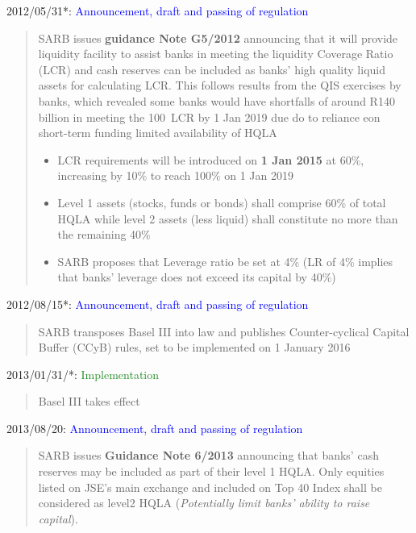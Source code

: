 \documentclass[
  letterpaper,
  DIV=11,
  numbers=noendperiod]{scrartcl}
\begin{document}
2012/05/31*:
\textcolor{blue}{Announcement, draft and passing of regulation}

\begin{quote}
SARB issues \textbf{guidance Note G5/2012} announcing that it will provide  liquidity facility to assist banks in meeting the liquidity Coverage Ratio (LCR) and cash reserves can be included as banks' high quality liquid assets for calculating LCR. This follows results from the QIS exercises by banks,  which revealed some banks would have shortfalls of around R140 billion in meeting the 100\ LCR  by 1 Jan 2019 due do to reliance eon short-term funding limited availability of HQLA

\begin{itemize}
    \item LCR requirements will be introduced on \textbf{1 Jan 2015} at 60\%, increasing by 10\% to reach 100\% on 1 Jan 2019
\item Level 1 assets (stocks, funds or bonds) shall comprise 60\% of total HQLA  while level 2 assets (less liquid) shall constitute no more than the remaining 40\%
\item SARB proposes that Leverage ratio be set at 4\% (LR of 4\% implies that banks' leverage does not exceed its capital by 40\%)
\end{itemize}
\end{quote}

2012/08/15*:
\textcolor{blue}{Announcement, draft and passing of regulation}

\begin{quote}
SARB transposes Basel III into law and publishes Counter-cyclical Capital Buffer (CCyB) rules, set to be implemented on 1 January 2016
\end{quote}

2013/01/31/*: \textcolor{ForestGreen}{Implementation}

\begin{quote}
    Basel III takes effect
\end{quote}

2013/08/20:
\textcolor{blue}{Announcement, draft and passing of regulation}

\begin{quote}
 SARB issues \textbf{Guidance Note 6/2013} announcing that banks' cash reserves may be included as part of their level 1 HQLA. Only equities listed on JSE's main exchange and included on Top 40 Index shall be considered as level2 HQLA (\textit{Potentially limit banks' ability to raise capital}).
\end{quote}
\end{document}
